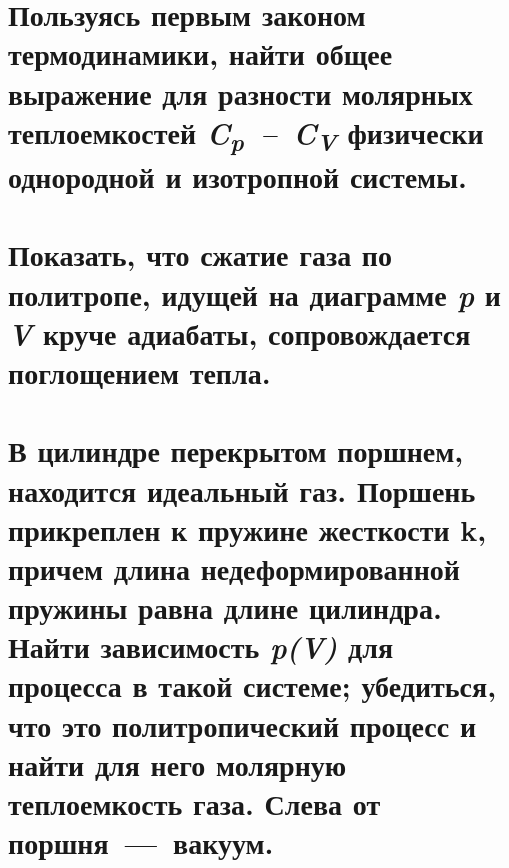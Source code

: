 \section{Пользуясь первым законом термодинамики, найти общее выражение для разности молярных теплоемкостей \emph{C\textsubscript{p}~--~C\textsubscript{V}} физически однородной и изотропной системы.}

\section{Показать, что сжатие газа по политропе, идущей на диаграмме \emph{p} и \emph{V} круче адиабаты, сопровождается поглощением тепла. }

\section{В цилиндре перекрытом поршнем, находится идеальный газ. Поршень
прикреплен к пружине жесткости k, причем длина недеформированной пружины
равна длине цилиндра. Найти зависимость \emph{p(V)} для процесса в такой
системе; убедиться, что это политропический процесс и найти для него
молярную теплоемкость газа. Слева от поршня~---~вакуум.}
